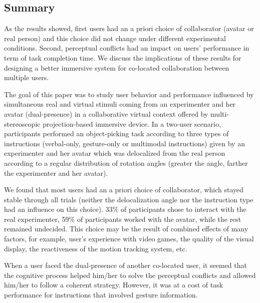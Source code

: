 \subsection{Summary}
As the results showed, first users had an a priori choice of collaborator (avatar or real person) and this choice did not change under different experimental conditions. Second, perceptual conflicts had an impact on users' performance in term of task completion time. We discuss the implications of these results for designing a better immersive system for co-located collaboration between multiple users.

The goal of this paper was to study user behavior and performance influenced by simultaneous real and virtual stimuli coming from an experimenter and her avatar (dual-presence) in a collaborative virtual context offered by multi-stereoscopic projection-based immersive device. In a two-user scenario, participants performed an object-picking task according to three types of instructions (verbal-only, gesture-only or multimodal instructions) given by an experimenter and her avatar which was delocalized from the real person according to a regular distribution of rotation angles (greater the angle, farther the experimenter and her avatar).

We found that most users had an a priori choice of collaborator, which stayed stable through all trials (neither the delocalization angle nor the instruction type had an influence on this choice). 33\% of participants chose to interact with the real experimenter, 59\% of participants worked with the avatar, while the rest remained undecided. This choice may be the result of combined effects of many factors, for example, user's experience with video games, the quality of the visual display, the reactiveness of the motion tracking system, etc.

When a user faced the dual-presence of another co-located user, it seemed that the cognitive process helped him/her to solve the perceptual conflicts and allowed him/her to follow a coherent strategy. However, it was at a cost of task performance for instructions that involved gesture information.

